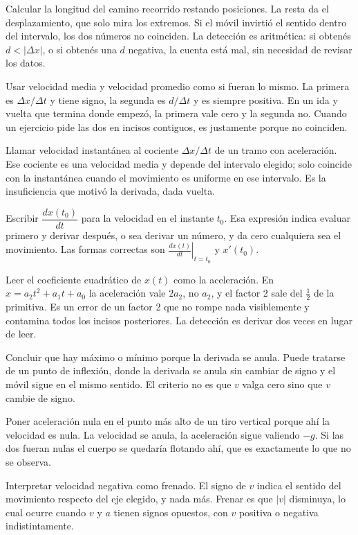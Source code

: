 \documentclass[11pt,openany]{book}
\begin{document}
\begin{erroresComunes}
  \item Calcular la longitud del camino recorrido restando posiciones. La resta da el desplazamiento, que solo mira los extremos. Si el móvil invirtió el sentido dentro del intervalo, los dos números no coinciden. La detección es aritmética: si obtenés $d < \lvert\Delta x\rvert$, o si obtenés una $d$ negativa, la cuenta está mal, sin necesidad de revisar los datos.
  \item Usar velocidad media y velocidad promedio como si fueran lo mismo. La primera es $\Delta x/\Delta t$ y tiene signo, la segunda es $d/\Delta t$ y es siempre positiva. En un ida y vuelta que termina donde empezó, la primera vale cero y la segunda no. Cuando un ejercicio pide las dos en incisos contiguos, es justamente porque no coinciden.
  \item Llamar velocidad instantánea al cociente $\Delta x/\Delta t$ de un tramo con aceleración. Ese cociente es una velocidad media y depende del intervalo elegido; solo coincide con la instantánea cuando el movimiento es uniforme en ese intervalo. Es la insuficiencia que motivó la derivada, dada vuelta.
  \item Escribir $\dfrac{dx(t_0)}{dt}$ para la velocidad en el instante $t_0$. Esa expresión indica evaluar primero y derivar después, o sea derivar un número, y da cero cualquiera sea el movimiento. Las formas correctas son $\left.\frac{dx(t)}{dt}\right\rvert_{t=t_0}$ y $x'(t_0)$.
  \item Leer el coeficiente cuadrático de $x(t)$ como la aceleración. En $x = a_2t^2 + a_1t + a_0$ la aceleración vale $2a_2$, no $a_2$, y el factor 2 sale del $\tfrac12$ de la primitiva. Es un error de un factor 2 que no rompe nada visiblemente y contamina todos los incisos posteriores. La detección es derivar dos veces en lugar de leer.
  \item Concluir que hay máximo o mínimo porque la derivada se anula. Puede tratarse de un punto de inflexión, donde la derivada se anula sin cambiar de signo y el móvil sigue en el mismo sentido. El criterio no es que $v$ valga cero sino que $v$ cambie de signo.
  \item Poner aceleración nula en el punto más alto de un tiro vertical porque ahí la velocidad es nula. La velocidad se anula, la aceleración sigue valiendo $-g$. Si las dos fueran nulas el cuerpo se quedaría flotando ahí, que es exactamente lo que no se observa.
  \item Interpretar velocidad negativa como frenado. El signo de $v$ indica el sentido del movimiento respecto del eje elegido, y nada más. Frenar es que $\lvert v\rvert$ disminuya, lo cual ocurre cuando $v$ y $a$ tienen signos opuestos, con $v$ positiva o negativa indistintamente.

\end{erroresComunes}
\end{document}
